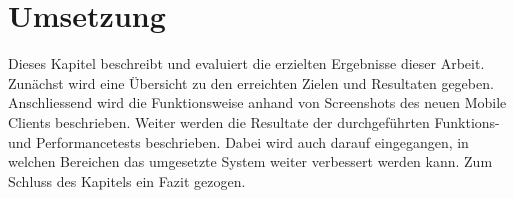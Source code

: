 \section{Umsetzung}

Dieses Kapitel beschreibt und evaluiert die erzielten Ergebnisse dieser Arbeit.
Zunächst wird eine Übersicht zu den erreichten Zielen und Resultaten gegeben.
Anschliessend wird die Funktionsweise anhand von Screenshots des neuen Mobile Clients beschrieben.
Weiter werden die Resultate der durchgeführten Funktions- und Performancetests beschrieben.
Dabei wird auch darauf eingegangen, in welchen Bereichen das umgesetzte System weiter verbessert werden kann.
Zum Schluss des Kapitels ein Fazit gezogen.





\clearpage

